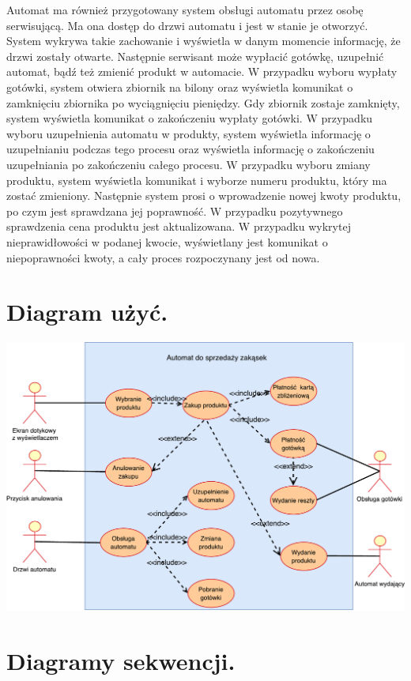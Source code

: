 \documentclass[11pt]{article}
\begin{document}
			Automat ma również przygotowany system obsługi automatu przez osobę serwisującą. Ma ona dostęp do drzwi automatu i jest w stanie je otworzyć. System wykrywa takie zachowanie i wyświetla w danym momencie informację, że drzwi zostały otwarte. Następnie serwisant może wypłacić gotówkę, uzupełnić automat, bądź też zmienić produkt w automacie. W przypadku wyboru wypłaty gotówki, system otwiera zbiornik na bilony oraz wyświetla komunikat o zamknięciu zbiornika po wyciągnięciu pieniędzy. Gdy zbiornik zostaje zamknięty, system wyświetla komunikat o zakończeniu wypłaty gotówki. W przypadku wyboru uzupełnienia automatu
			w produkty, system wyświetla informację o uzupełnianiu podczas tego procesu oraz wyświetla informację o zakończeniu uzupełniania po zakończeniu całego procesu. W przypadku wyboru zmiany produktu, system wyświetla komunikat i wyborze numeru produktu, który ma zostać zmieniony. Następnie system prosi o wprowadzenie nowej kwoty produktu, po czym jest sprawdzana jej poprawność. W przypadku pozytywnego sprawdzenia cena produktu jest aktualizowana. W przypadku wykrytej nieprawidłowości w podanej kwocie, wyświetlany jest komunikat o niepoprawności kwoty, a cały proces rozpoczynany jest od nowa.  
			
	\newpage
    \section{Diagram użyć.}
		\begin{center}
			\includegraphics[scale=0.65]{UseCaseDiagram.pdf}
		\end{center}
		\newpage
	\section{Diagramy sekwencji.}
\end{document}
